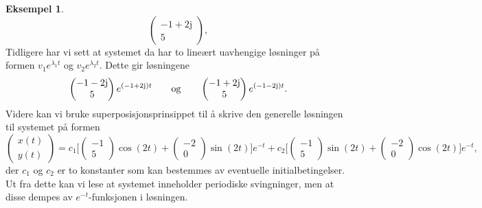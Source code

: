 \documentclass{article}
\theoremstyle{plain}
\theoremstyle{definition}
\newtheorem{eksempel}[teorem]{Eksempel}
\theoremstyle{remark}
\newcommand{\expfcn}[1]{e^{#1}}
\newcommand{\biggbrac}[1]{\bigg[#1\bigg]}
\newcommand{\imagunit}{\mathrm{j}}
\begin{document}
\begin{eksempel}
\begin{equation*}
\begin{pmatrix}
            -1 + 2 \imagunit \\
            5
        \end{pmatrix},
    \end{equation*}
    Tidligere har vi sett at systemet da har to lineært uavhengige løsninger på formen $v_1 \expfcn{\lambda_1 t}$ og $v_2 \expfcn{\lambda_2 t}$. Dette gir løsningene
    \begin{equation*}
        \begin{pmatrix}
            -1 - 2 \imagunit \\
            5
        \end{pmatrix}
        \expfcn{(-1 + 2 \imagunit) t} \qquad \textnormal{og} \qquad
        \begin{pmatrix}
            -1 + 2 \imagunit \\
            5
        \end{pmatrix}
        \expfcn{(-1 - 2 \imagunit) t}.
    \end{equation*}
    Videre kan vi bruke superposisjonsprinsippet til å skrive den generelle løsningen til systemet på formen
    \begin{equation*}
        \begin{pmatrix}
            x(t) \\
            y(t)
        \end{pmatrix}
        = c_1 \biggbrac{
            \begin{pmatrix}
                -1 \\
                5
            \end{pmatrix}
            \cos(2t) +
            \begin{pmatrix}
                -2 \\
                0
            \end{pmatrix}
            \sin(2t)
        } \expfcn{-t} + c_2 \biggbrac{
            \begin{pmatrix}
                -1 \\
                5
            \end{pmatrix}
            \sin(2t) +
            \begin{pmatrix}
                -2 \\
                0
            \end{pmatrix}
            \cos(2t)
        } \expfcn{-t},
    \end{equation*}
    der $c_1$ og $c_2$ er to konstanter som kan bestemmes av eventuelle initialbetingelser. Ut fra dette kan vi lese at systemet inneholder periodiske svingninger, men at disse dempes av $\expfcn{-t}$-funksjonen i løsningen.
    

\end{eksempel}
\end{document}
